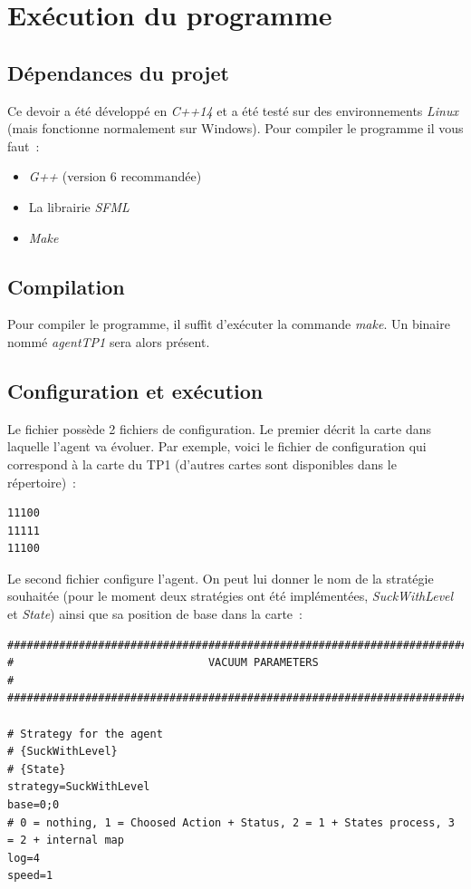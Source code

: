 \documentclass{article}
\begin{document}
\section{Exécution du programme}
\subsection{Dépendances du projet}
Ce devoir a été développé en \emph{C++14} et a été testé sur des environnements \emph{Linux} (mais fonctionne normalement sur Windows). Pour compiler le programme il vous faut~:
\begin{itemize}
    \item \emph{G++} (version 6 recommandée)
    \item La librairie \emph{SFML}
    \item \emph{Make}
\end{itemize}
\subsection{Compilation}
Pour compiler le programme, il suffit d'exécuter la commande \emph{make}. Un binaire nommé \emph{agentTP1} sera alors présent.
\subsection{Configuration et exécution}
Le fichier possède 2 fichiers de configuration. Le premier décrit la carte dans laquelle l'agent va évoluer. Par exemple, voici le fichier de configuration qui correspond à la carte du TP1 (d'autres cartes sont disponibles dans le répertoire)~:
\begin{verbatim}
11100
11111
11100
\end{verbatim}

Le second fichier configure l'agent. On peut lui donner le nom de la stratégie souhaitée (pour le moment deux stratégies ont été implémentées, \emph{SuckWithLevel} et \emph{State}) ainsi que sa position de base dans la carte~:

\begin{verbatim}
###############################################################################
#                              VACUUM PARAMETERS                              #
###############################################################################

# Strategy for the agent
# {SuckWithLevel}
# {State}
strategy=SuckWithLevel
base=0;0
# 0 = nothing, 1 = Choosed Action + Status, 2 = 1 + States process, 3 = 2 + internal map
log=4
speed=1
\end{verbatim}
\end{document}
